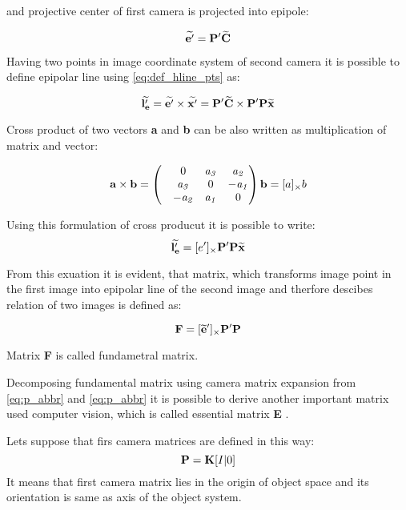 \documentclass[a4paper,12pt]{report}
\newcommand{\ematr}[1]{
{\bf #1}
}
\newcommand{\evect}[1]{
{\bf #1}
}
\newcommand{\ehvect}[1]{
{\bf \widetilde{#1}}
}
\newcommand{\escal}[1]{
{\it #1}
}
\begin{document}
and projective center of first camera is projected into epipole: 

\begin{equation}
\ehvect{e'} =  \ematr{P'}\ehvect{C}
\end{equation}

Having two points in image coordinate system of second camera it is possible to define epipolar line using \eqref{eq:def_hline_pts} as:

\begin{equation}
\ehvect{l'_{e}} =  \ehvect{e'} \times \ehvect{x'} = \ematr{P'}\ehvect{C} \times \ematr{P'}\ematr{P}\ehvect{x}
\end{equation}

Cross product of two vectors \evect{a} and \evect{b} can be also written as multiplication of matrix and vector:

\begin{equation}
\evect{a}  \times \evect{b}  = 
\begin{pmatrix}
   & 0      & \escal{a_{3}}   & \escal{a_{2}}\\
   & \escal{a_{3}}  & 0               & \escal{-a_{1}}\\
   & \escal{-a_{2}} & \escal{a_{1}}   & 0\\
\end{pmatrix}
\evect{b} = [a]_{\times} b
\end{equation}

Using this formulation of cross producut it is possible to write:
\begin{equation}
\ehvect{l'_{e}}  = [e']_{\times} \ematr{P'}\ematr{P}\ehvect{x}
\end{equation}

From this exuation it is evident, that matrix, which transforms image point in the first image into 
epipolar line of the second image and therfore descibes relation of two images is defined as:

\begin{equation}
\ematr{F}  = [\ehvect{e}']_{\times} \ematr{P'}\ematr{P}
\end{equation}

Matrix \ematr{F} is called fundametral matrix. 

Decomposing fundamental matrix using camera matrix expansion from \eqref{eq:p_abbr} and \eqref{eq:p_abbr}
it is possible to derive another important matrix used computer vision, which is called essential matrix \ematr{E}.

Lets suppose that firs camera matrices are defined in this way:
\begin{equation}
\ematr{P}  = \ematr{K} \ematr{[}I|0\ematr{]}
\end{equation}
It means that first camera matrix lies in the origin of object space and its orientation is same
as axis of the object system.
\end{document}
